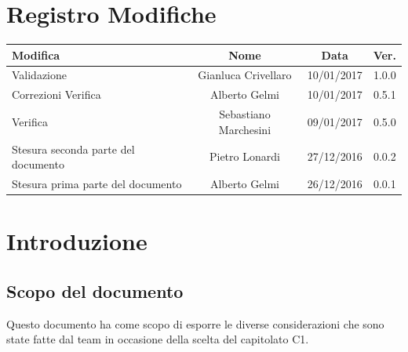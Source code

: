 \documentclass[12pt,a4paper,titlepage]{article}
\renewcommand{\headrulewidth}{0.4pt}
\renewcommand{\footrulewidth}{0.4pt}
\begin{document}
	
	
	\clearpage %
	
	
	\chead{}
	\cfoot{}
	\rfoot{\thepage}
	\renewcommand{\headrulewidth}{0.2pt}
	\renewcommand{\footrulewidth}{0.2pt}
	
	\section{Registro Modifiche}
	\small %
	{\renewcommand\arraystretch{1.2}  %
		\begin{tabular}{|l|c|c|c|}
			\hline
			{\textbf{Modifica}}&{\textbf{Nome}}&{\textbf{Data}}&{\textbf{Ver.}}\\
			\hline
			Validazione & Gianluca Crivellaro & 10/01/2017 & 1.0.0 \\
			\hline
			Correzioni Verifica & Alberto Gelmi & 10/01/2017 & 0.5.1 \\
			\hline
			Verifica & Sebastiano Marchesini & 09/01/2017 & 0.5.0 \\
			\hline
			Stesura seconda parte del documento & Pietro Lonardi & 27/12/2016 & 0.0.2 \\
			\hline
			Stesura prima parte del documento & Alberto Gelmi & 26/12/2016 & 0.0.1 \\
			\hline
			
		\end{tabular}
	}
	
	\newpage
	
	\tableofcontents
	\thispagestyle{empty}
	
	\newpage
	
	
	\section{Introduzione}
	
	\subsection{Scopo del documento}
	Questo documento ha come scopo di esporre le diverse considerazioni che sono state fatte dal team in occasione della scelta del capitolato C1.
	
\end{document}
